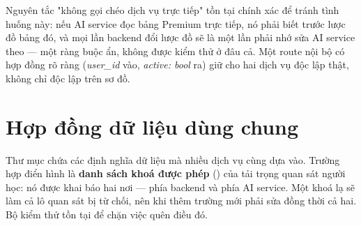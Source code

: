 \begin{luuy}
Nguyên tắc "không gọi chéo dịch vụ trực tiếp" tồn tại chính xác để tránh tình huống
này: nếu AI service đọc bảng Premium trực tiếp, nó phải biết trước lược đồ bảng đó, và
mọi lần backend đổi lược đồ sẽ là một lần phải nhớ sửa AI service theo — một ràng buộc
ẩn, không được kiểm thử ở đâu cả. Một route nội bộ có hợp đồng rõ ràng
(\textit{user\_id} vào, \textit{active: bool} ra) giữ cho hai dịch vụ độc lập thật, không
chỉ độc lập trên sơ đồ.
\end{luuy}

\section{Hợp đồng dữ liệu dùng chung}

Thư mục  chứa các định nghĩa dữ liệu mà nhiều dịch vụ cùng dựa vào.
Trường hợp điển hình là \textbf{danh sách khoá được phép} () của tải trọng
quan sát người học: nó được khai báo hai nơi —  phía
backend và  phía AI service. Một khoá lạ
sẽ làm cả lô quan sát bị từ chối, nên khi thêm trường mới phải sửa đồng thời cả hai. Bộ
kiểm thử  tồn tại để chặn việc quên điều đó.

